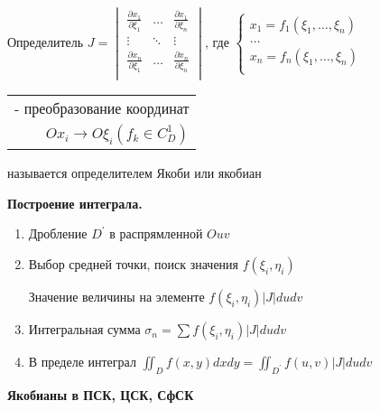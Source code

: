 \documentclass[12pt]{article}
\begin{document}
    \Def Определитель $J = \begin{vmatrix}
                               \frac{\partial x_1}{\partial \xi_1} & \dots  & \frac{\partial x_1}{\partial \xi_n} \\
                               \vdots                              & \ddots & \vdots                              \\
                               \frac{\partial x_n}{\partial \xi_1} & \dots  & \frac{\partial x_n}{\partial \xi_n} \\
    \end{vmatrix}$, где $\begin{cases}
                             x_1 = f_1(\xi_1, \dots, \xi_n) \\
                             \dots \\
                             x_n = f_n(\xi_1, \dots, \xi_n) \\
    \end{cases}$ \begin{tabular}{r} - преобразование координат \\ $Ox_i \to O\xi_i (f_k \in C^1_D)$ \end{tabular}

    называется определителем Якоби или якобиан

    \vspace{5mm}

    \textbf{Построение интеграла.}
    \begin{enumerate}
        \item Дробление $D^\prime$ в распрямленной $Ouv$
        \item Выбор средней точки, поиск значения $f(\xi_i, \eta_i)$

        Значение величины на элементе $f(\xi_i, \eta_i) |J| du dv$
        \item Интегральная сумма $\sigma_n = \sum f(\xi_i, \eta_i) |J| du dv$
        \item В пределе интеграл $\iint_D f(x, y) dx dy = \iint_{D^\prime} f(u, v) |J| du dv$
    \end{enumerate}

    \vspace{5mm}

    \textbf{Якобианы в ПСК, ЦСК, СфСК}
\end{document}
